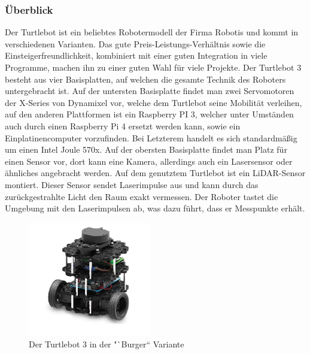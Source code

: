 {{		\subsubsection{Überblick}
		{
			Der Turtlebot ist ein beliebtes Robotermodell der Firma Robotis und kommt in verschiedenen Varianten. Das gute Preis-Leistungs-Verhältnis sowie die Einsteigerfreundlichkeit, kombiniert mit einer guten Integration in viele Programme, machen ihn zu einer guten Wahl für viele Projekte.
			Der Turtlebot 3 besteht aus vier Basisplatten, auf welchen die gesamte Technik des Roboters untergebracht ist. Auf der untersten Basisplatte findet man zwei Servomotoren der X-Series von Dynamixel vor, welche dem Turtlebot seine Mobilität verleihen, auf den anderen Plattformen ist ein Raspberry PI 3, welcher unter Umständen auch durch einen Raspberry Pi 4 ersetzt werden kann, sowie ein Einplatinencomputer vorzufinden. Bei Letzterem handelt es sich standardmäßig um einen Intel Joule 570x. Auf der obersten Basisplatte findet man Platz für einen Sensor vor, dort kann eine Kamera, allerdings auch ein Lasersensor oder ähnliches angebracht werden. Auf dem genutztem Turtlebot ist ein LiDAR-Sensor montiert. Dieser Sensor sendet Laserimpulse aus und kann durch das zurückgestrahlte Licht den Raum exakt vermessen. Der Roboter tastet die Umgebung mit den Laserimpulsen ab, was dazu führt, dass er Messpunkte erhält. 
			
			\begin{figure}[H]
				\centering
				\includegraphics[height=5cm]{Bilder/turtlebot_3_burger.png}
				\caption{Der Turtlebot 3 in der "`Burger“ Variante} 
				\label{pic:turtle3burger}
			\end{figure}
			
		}
		
}}
